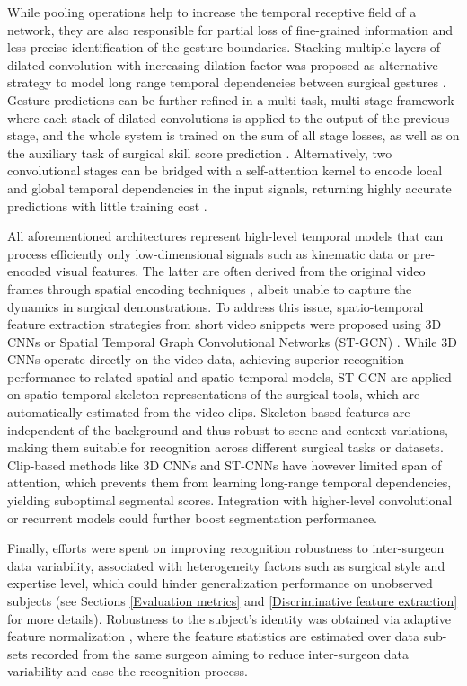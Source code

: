 \documentclass[journal]{IEEEtran}
\begin{document}
While pooling operations help to increase the temporal receptive field of a network, they are also responsible for partial loss of fine-grained information and less precise identification of the gesture boundaries. Stacking multiple layers of dilated convolution with increasing dilation factor was proposed as alternative strategy to model long range temporal dependencies between surgical gestures \cite{Menegozzo2019}. Gesture predictions can be further refined in a multi-task, multi-stage framework where each stack of dilated convolutions is applied to the output of the previous stage, and the whole system is trained on the sum of all stage losses, as well as on the auxiliary task of surgical skill score prediction \cite{Wang2020}. Alternatively, two convolutional stages can be bridged with a self-attention kernel to encode local and global temporal dependencies in the input signals, returning highly accurate predictions with little training cost \cite{Zhang2020}.

All aforementioned architectures represent high-level temporal models that can process efficiently only low-dimensional signals such as kinematic data or pre-encoded visual features. 
The latter are often derived from the original video frames through spatial encoding techniques \cite{Lea2016}, albeit unable to capture the dynamics in surgical demonstrations.
To address this issue, spatio-temporal feature extraction strategies from short video snippets were proposed using 3D CNNs \cite{Funke2019} or Spatial Temporal Graph Convolutional Networks (ST-GCN) \cite{Sarikaya2020}. While 3D CNNs operate directly on the video data, achieving superior recognition performance to related spatial \cite{Lea2016} and spatio-temporal \cite{Lea2016} models, ST-GCN are applied on spatio-temporal skeleton representations of the surgical tools, which are automatically estimated from the video clips. Skeleton-based features are independent of the background and thus robust to scene and context variations, making them suitable for recognition across different surgical tasks or datasets. 
Clip-based methods like 3D CNNs and ST-CNNs have however limited span of attention, which prevents them from learning long-range temporal dependencies, yielding suboptimal segmental scores.  
Integration with higher-level convolutional or recurrent models could further boost segmentation performance.

Finally, efforts were spent on improving recognition robustness to inter-surgeon data variability, associated with heterogeneity factors such as surgical style and expertise level, which could hinder generalization performance on unobserved subjects \cite{Ahmidi2017} (see Sections \ref{Evaluation metrics} and \ref{Discriminative feature extraction} for more details).
Robustness to the subject's identity was obtained via adaptive feature normalization \cite{Kaku2020}, where the feature statistics are estimated over data sub-sets recorded from the same surgeon aiming to reduce inter-surgeon data variability and ease the recognition process.
\end{document}
